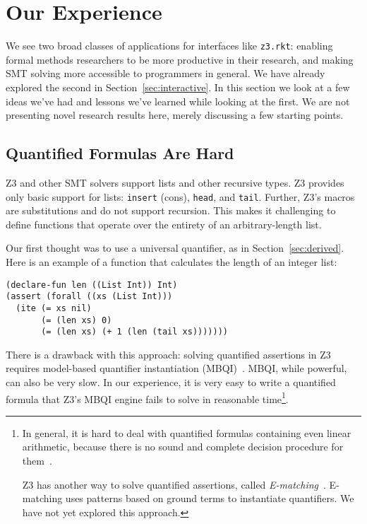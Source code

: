 \section{Our Experience}

We see two broad classes of applications for interfaces like \texttt{z3.rkt}:
enabling formal methods researchers to be more productive in their research,
and making SMT solving more accessible to programmers in general. We have
already explored the second in Section~\ref{sec:interactive}. In this section
we look at a few ideas we've had and lessons we've learned while looking at
the first. We are not presenting novel research results here, merely
discussing a few starting points.

\subsection{Quantified Formulas Are Hard}
\label{sec:quantified}

Z3 and other SMT solvers support lists and other recursive types. Z3 provides
only basic support for lists: \texttt{insert} (cons), \texttt{head}, and
\texttt{tail}. Further, Z3's macros are substitutions and do not support
recursion. This makes it challenging to define functions that operate over the
entirety of an arbitrary-length list.

Our first thought was to use a universal quantifier, as in
Section~\ref{sec:derived}. Here is an example of a function that calculates
the length of an integer list:

\begin{verbatim}
(declare-fun len ((List Int)) Int)
(assert (forall ((xs (List Int)))
  (ite (= xs nil)
       (= (len xs) 0)
       (= (len xs) (+ 1 (len (tail xs)))))))
\end{verbatim}

There is a drawback with this approach: solving quantified assertions in Z3
requires model-based quantifier instantiation (MBQI)~\cite{mbqi}. MBQI, while
powerful, can also be very slow. In our experience, it is very easy to write a
quantified formula that Z3's MBQI engine fails to solve in reasonable
time\footnote{In general, it is hard to deal with quantified formulas
containing even linear arithmetic, because there is no sound and complete
decision procedure for them~\cite{halpern91}.

Z3 has another way to solve quantified assertions, called
\textit{E-matching}~\cite{e-matching}. E-matching uses patterns based on
ground terms to instantiate quantifiers. We have not yet explored this
approach.}.

